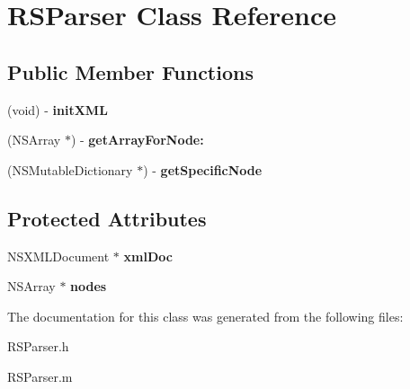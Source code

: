\hypertarget{interface_r_s_parser}{
\section{RSParser Class Reference}
\label{interface_r_s_parser}
}
\subsection*{Public Member Functions}
\begin{DoxyCompactItemize}
\item 
\hypertarget{interface_r_s_parser_aeedae717304e5e71404bf943898dfb4a}{
(void) -\/ {\bfseries initXML}}
\label{interface_r_s_parser_aeedae717304e5e71404bf943898dfb4a}

\item 
\hypertarget{interface_r_s_parser_aba61bbecfb703611b457c820c2ea8e22}{
(NSArray $\ast$) -\/ {\bfseries getArrayForNode:}}
\label{interface_r_s_parser_aba61bbecfb703611b457c820c2ea8e22}

\item 
\hypertarget{interface_r_s_parser_a7048976931df1633b7718677fc4bab8e}{
(NSMutableDictionary $\ast$) -\/ {\bfseries getSpecificNode}}
\label{interface_r_s_parser_a7048976931df1633b7718677fc4bab8e}

\end{DoxyCompactItemize}
\subsection*{Protected Attributes}
\begin{DoxyCompactItemize}
\item 
\hypertarget{interface_r_s_parser_a61c3412454e33eb5108d1a01c284f0c2}{
NSXMLDocument $\ast$ {\bfseries xmlDoc}}
\label{interface_r_s_parser_a61c3412454e33eb5108d1a01c284f0c2}

\item 
\hypertarget{interface_r_s_parser_a6f1bdd2623fb1fc0e8abfab215258459}{
NSArray $\ast$ {\bfseries nodes}}
\label{interface_r_s_parser_a6f1bdd2623fb1fc0e8abfab215258459}

\end{DoxyCompactItemize}


The documentation for this class was generated from the following files:\begin{DoxyCompactItemize}
\item 
RSParser.h\item 
RSParser.m\end{DoxyCompactItemize}
